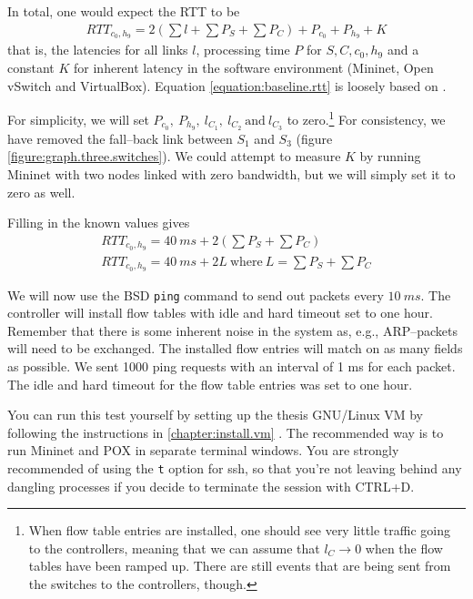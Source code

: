 In total, one would expect the \acf{RTT} to be
\begin{gather}
  RTT_{c_0, h_9} = 2\left( \sum l + \sum P_S + \sum P_C \right) + P_{c_0} + P_{h_9} + K
  \label{equation:baseline.rtt}
\end{gather}%
that is, the latencies for all links $l$, processing time $P$ for
$S,C,c_0,h_9$ and a constant $K$ for inherent latency in the software
environment (Mininet, Open vSwitch and VirtualBox).  Equation
\ref{equation:baseline.rtt} is loosely based on
\cite{DBLP:conf/cnsm/PhemiusB13}.

For simplicity, we will set $P_{c_0},~P_{h_9},~l_{C_1},~l_{C_2}~\text{and}~
l_{C_3}$ to zero.\footnote{When flow table entries are installed, one should
see very little traffic going to the controllers, meaning that we can
assume that $l_{C} \to 0$ when the flow tables have been ramped up.
There are still events that are being sent from the switches to the
controllers, though.}
For consistency, we have removed the fall--back link
between $S_1$ and $S_3$ (figure \ref{figure:graph.three.switches}).
We could attempt to measure $K$ by running Mininet with two nodes linked
with zero bandwidth, but we will simply set it to zero as well.

Filling in the known values gives
\begin{gather}
  RTT_{c_0,h_9} = 40~ms + 2\left( \sum P_S + \sum P_C \right)
  \\
  RTT_{c_0,h_9} = 40~ms + 2L~\text{where}~L = \sum P_S + \sum P_C
  \label{equation:expected.baseline.rtt}
\end{gather}

We will now use the BSD \texttt{ping} command to send out packets every
$10~ms$.  The controller will install flow tables with idle and hard timeout
set to one hour.  Remember that there is some inherent noise in the system
as, e.g., ARP--packets will need to be exchanged.  The installed flow
entries will match on as many fields as possible.
We sent 1000 ping requests with an interval of 1 ms for each packet.
The idle and hard timeout for the flow table entries was set to one hour.

You can run this test yourself by setting up the thesis GNU/Linux VM
by following the instructions in \ref{chapter:install.vm}
. The recommended way is to run Mininet and POX
in separate terminal windows. You are strongly recommended of using the
\texttt{\-{}t} option for ssh, so that you're not leaving behind any
dangling processes if you decide to terminate the session with CTRL+D.


